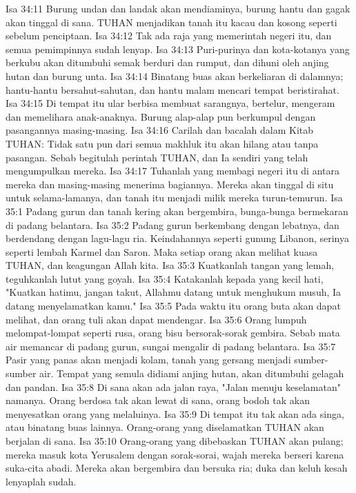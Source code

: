 Isa 34:11  Burung undan dan landak akan mendiaminya, burung hantu dan gagak akan tinggal di sana. TUHAN menjadikan tanah itu kacau dan kosong seperti sebelum penciptaan.
Isa 34:12  Tak ada raja yang memerintah negeri itu, dan semua pemimpinnya sudah lenyap.
Isa 34:13  Puri-purinya dan kota-kotanya yang berkubu akan ditumbuhi semak berduri dan rumput, dan dihuni oleh anjing hutan dan burung unta.
Isa 34:14  Binatang buas akan berkeliaran di dalamnya; hantu-hantu bersahut-sahutan, dan hantu malam mencari tempat beristirahat.
Isa 34:15  Di tempat itu ular berbisa membuat sarangnya, bertelur, mengeram dan memelihara anak-anaknya. Burung alap-alap pun berkumpul dengan pasangannya masing-masing.
Isa 34:16  Carilah dan bacalah dalam Kitab TUHAN: Tidak satu pun dari semua makhluk itu akan hilang atau tanpa pasangan. Sebab begitulah perintah TUHAN, dan Ia sendiri yang telah mengumpulkan mereka.
Isa 34:17  Tuhanlah yang membagi negeri itu di antara mereka dan masing-masing menerima bagiannya. Mereka akan tinggal di situ untuk selama-lamanya, dan tanah itu menjadi milik mereka turun-temurun.
Isa 35:1  Padang gurun dan tanah kering akan bergembira, bunga-bunga bermekaran di padang belantara.
Isa 35:2  Padang gurun berkembang dengan lebatnya, dan berdendang dengan lagu-lagu ria. Keindahannya seperti gunung Libanon, serinya seperti lembah Karmel dan Saron. Maka setiap orang akan melihat kuasa TUHAN, dan keagungan Allah kita.
Isa 35:3  Kuatkanlah tangan yang lemah, teguhkanlah lutut yang goyah.
Isa 35:4  Katakanlah kepada yang kecil hati, "Kuatkan hatimu, jangan takut, Allahmu datang untuk menghukum musuh, Ia datang menyelamatkan kamu."
Isa 35:5  Pada waktu itu orang buta akan dapat melihat, dan orang tuli akan dapat mendengar.
Isa 35:6  Orang lumpuh melompat-lompat seperti rusa, orang bisu bersorak-sorak gembira. Sebab mata air memancar di padang gurun, sungai mengalir di padang belantara.
Isa 35:7  Pasir yang panas akan menjadi kolam, tanah yang gersang menjadi sumber-sumber air. Tempat yang semula didiami anjing hutan, akan ditumbuhi gelagah dan pandan.
Isa 35:8  Di sana akan ada jalan raya, "Jalan menuju keselamatan" namanya. Orang berdosa tak akan lewat di sana, orang bodoh tak akan menyesatkan orang yang melaluinya.
Isa 35:9  Di tempat itu tak akan ada singa, atau binatang buas lainnya. Orang-orang yang diselamatkan TUHAN akan berjalan di sana.
Isa 35:10  Orang-orang yang dibebaskan TUHAN akan pulang; mereka masuk kota Yerusalem dengan sorak-sorai, wajah mereka berseri karena suka-cita abadi. Mereka akan bergembira dan bersuka ria; duka dan keluh kesah lenyaplah sudah.

